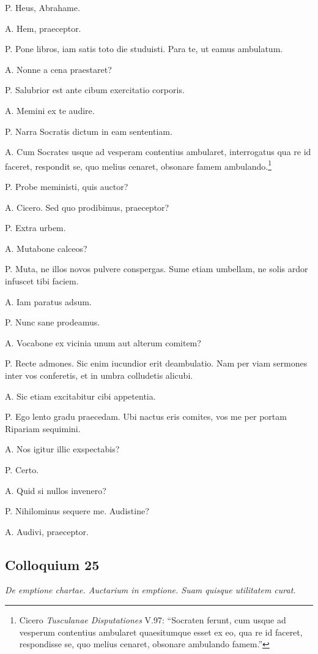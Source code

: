 \documentclass{article}
\begin{document}
P. Heus, Abrahame.

A. Hem, praeceptor.

P. Pone libros, iam satis toto die studuisti. Para te, ut eamus ambulatum.

A. Nonne a cena praestaret?

P. Salubrior est ante cibum exercitatio corporis.

A. Memini ex te audire.

P. Narra Socratis dictum in eam sententiam.

A. Cum Socrates usque ad vesperam contentius ambularet, interrogatus qua re id faceret, respondit se, quo melius cenaret, obsonare famem ambulando.\footnote{Cicero \emph{Tusculanae Disputationes} V.97: ``Socraten ferunt, cum usque ad vesperum contentius ambularet quaesitumque esset ex eo, qua re id faceret, respondisse se, quo melius cenaret, obsonare ambulando famem.''}

P. Probe meministi, quis auctor?

A. Cicero. Sed quo prodibimus, praeceptor?

P. Extra urbem.

A. Mutabone calceos?

P. Muta, ne illos novos pulvere conspergas. Sume etiam umbellam, ne solis ardor infuscet tibi faciem.

A. Iam paratus adsum.

P. Nunc sane prodeamus.

A. Vocabone ex vicinia unum aut alterum comitem?

P. Recte admones. Sic enim iucundior erit deambulatio. Nam per viam sermones inter vos conferetis, et in umbra colludetis alicubi.

A. Sic etiam excitabitur cibi appetentia.

P. Ego lento gradu praecedam. Ubi nactus eris comites, vos me per portam Ripariam sequimini.

A. Nos igitur illic exspectabis?

P. Certo.

A. Quid si nullos invenero?

P. Nihilominus sequere me. Audistine?

A. Audivi, praeceptor.

\subsection{Colloquium 25}
\emph{De emptione chartae. Auctarium in emptione. Suam quisque utilitatem curat.}
\end{document}

